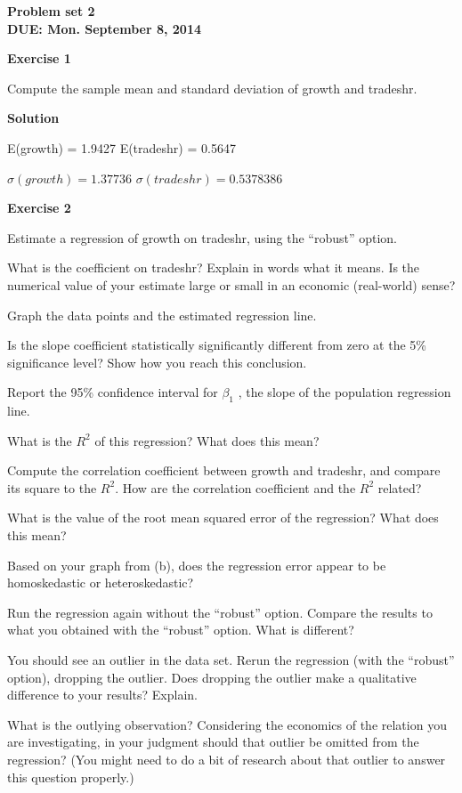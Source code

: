 \documentclass[12pt]{article}
\begin{document}


\begin{center}
\textbf{Problem set 2 \\
DUE: Mon. September 8, 2014 \\}
\end{center}


\bigskip
	
\textbf{Exercise 1}		
		
Compute the sample mean and standard deviation of growth and tradeshr.
\medskip
		
\textbf{Solution}

E(growth) = 1.9427
E(tradeshr) = 0.5647

$\sigma(growth) = 1.37736$
$\sigma(tradeshr) = 0.5378386$
\bigskip

\textbf{Exercise 2}
		
Estimate a regression of growth on tradeshr, using the “robust” option.

\begin{list}{)~}{}
\item
What is the coefficient on tradeshr? Explain in words what it means. Is the numerical value of your estimate large or small in an economic (real-world) sense?
\item
Graph the data points and the estimated regression line.
\item
Is the slope coefficient statistically significantly different from zero at the 5\% significance level? Show how you reach this conclusion.
\item
Report the 95\% confidence interval for $\beta_1$ , the slope of the population regression line.
\item
What is the $R^2$ of this regression? What does this mean?
\item
Compute the correlation coefficient between growth and tradeshr, and compare its square to the $R^2$. How are the correlation coefficient and the $R^2$ related?
\item
What is the value of the root mean squared error of the regression? What does this mean?
\item
Based on your graph from (b), does the regression error appear to be homoskedastic or heteroskedastic?
\item
Run the regression again without the “robust” option. Compare the results to what you obtained with the “robust” option. What is different?
\item
You should see an outlier in the data set. Rerun the regression (with the “robust” option), dropping the outlier. Does dropping the outlier make a qualitative difference to your results? Explain.
\item
What is the outlying observation? Considering the economics of the relation you are investigating, in your judgment should that outlier be omitted from the regression? (You might need to do a bit of research about that outlier to answer this question properly.)
\end{list}
\medskip
		
\end{document}
